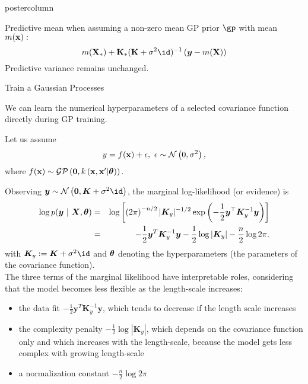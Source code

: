 \documentclass{beamer}
\begin{document}
\begin{frame}[fragile]{}
\begin{columns}
\begin{column}{.31\textwidth}
\begin{beamercolorbox}[center]{postercolumn}
\begin{minipage}{.98\textwidth}
{\begin{myblock}{}
								Predictive mean when assuming a non-zero mean GP prior $\gp$ with mean $m(\mathbf{x}):$ 
								$$
								m(\Xmat_*) + \Kmat_*(\Kmat +\sigma^2 \id)^{-1}\left(\bm{y} - m(\Xmat)\right)
								$$
								Predictive variance remains unchanged.
							\end{myblock}

  \begin{myblock}{Train a Gaussian Processes}
  
 We can learn the numerical hyperparameters of a selected covariance function directly during GP training.

 Let us assume 
$$
	y = f(\mathbf{x}) + \epsilon, ~ \epsilon \sim \mathcal{N}\left(0, \sigma^2\right),
$$
where $f(\mathbf{x}) \sim \mathcal{GP}\left(\bm{0}, k\left(\mathbf{x}, \mathbf{x}^\prime | \bm{\theta} \right)\right)$. 



Observing $\bm{y} \sim \mathcal{N}\left(\bm{0}, \bm{K} + \sigma^2 \id\right)$, the marginal log-likelihood (or evidence) is
\begin{eqnarray*}
\log p(\bm{y} ~|~ \bm{X}, \bm{\theta}) &=& \log \left[\left(2 \pi\right)^{-n / 2} |\bm{K}_y|^{-1 / 2} \exp\left(- \frac{1}{2} \bm{y}^\top \bm{K}_y^{-1} \bm{y}\right) \right]\\
&=& -\frac{1}{2}\bm{y}^T\bm{K}_y^{-1} \bm{y} - \frac{1}{2} \log \left| \bm{K}_y \right| - \frac{n}{2} \log 2\pi. 
\end{eqnarray*}
with $\bm{K}_y:=\bm{K} + \sigma^2 \id$ and $\bm{\theta}$ denoting the hyperparameters (the parameters of the covariance function). 
\\


The three terms of the marginal likelihood have interpretable roles, considering that 
the model becomes less flexible as the length-scale increases:
\begin{itemize}[$\bullet$]
\setlength{\itemindent}{+.3in}
\item the data fit $-\frac{1}{2}\bm{y}^T\bm{K}_y^{-1} \bm{y}$, which tends to decrease if the length scale increases
\item the complexity penalty $- \frac{1}{2} \log \left| \bm{K}_y \right|$, which depends on the covariance function only and which increases with the length-scale, because the model gets less complex with growing length-scale
\item a normalization constant $- \frac{n}{2} \log 2\pi$
\end{itemize}
\end{myblock}
  }
  
  \end{minipage}
  \end{beamercolorbox}
  \end{column}
  
  
  
\end{columns}
\end{frame}
\end{document}
